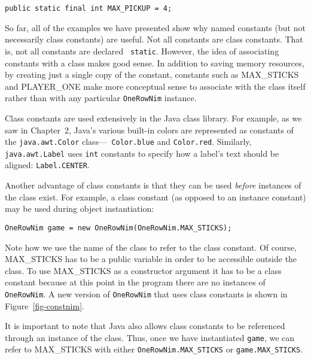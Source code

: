 \begin{jjjlisting}
\begin{lstlisting}
public static final int MAX_PICKUP = 4;
\end{lstlisting}
\end{jjjlisting}


So far, all of the examples we have presented show why named constants
(but not necessarily class constants) are useful. Not all constants
are class constants. That is, not all constants are declared {\tt
static}.  However, the idea of associating constants with a class
makes good sense.  In addition to saving memory resources, by creating
just a single copy of the constant, constants such as MAX\_STICKS and
PLAYER\_ONE make more conceptual sense to associate with the class
itself rather than with any particular {\tt OneRowNim} instance.

Class constants are used extensively in the Java class library.  For
example, as we saw in Chapter~2, Java's various built-in colors are
represented as constants of the {\tt java.awt.Color} class---{\tt
Color.blue} and {\tt Color.red}. Similarly, {\tt java.awt.Label}
uses {\tt int} constants to specify how a label's text should be
aligned: {\tt Label.CENTER}.

Another advantage of class constants is that they can be used {\em
before} instances of the class exist.  For example, a class constant
(as opposed to an instance constant) may be used during object
instantiation:

\begin{jjjlisting}
\begin{lstlisting}
OneRowNim game = new OneRowNim(OneRowNim.MAX_STICKS);
\end{lstlisting}
\end{jjjlisting}

\noindent Note how we use the name of the class to refer to
the class constant. Of course, MAX\_STICKS has to be a public variable
in order to be accessible outside the class. To use MAX\_STICKS as a
constructor argument it has to be a class constant because at this
point in the program there are no instances of {\tt OneRowNim}.
A new version of {\tt OneRowNim} that uses class constants is
shown in Figure~\ref{fig-constnim}.

It is important to note that Java also allows class constants to be
referenced through an instance of the class. Thus, once we
have instantiated {\tt game}, we can refer to MAX\_STICKS with
either {\tt OneRowNim.MAX\_STICKS} or {\tt game.MAX\_STICKS}. 

